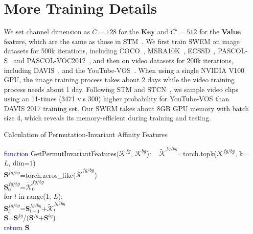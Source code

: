 \section{More Training Details}
\label{sec:TraingDetails}
We set channel dimension as $C=128$ for the \textbf{Key}  and $C'=512$ for the \textbf{Value} feature, which are the same as those in STM~\cite{Oh_2019_ICCV}. 
We first train SWEM on image datasets for 500k iterations, including COCO~\cite{cocolin2014microsoft}, MSRA10K~\cite{msra10kChengPAMI}, ECSSD~\cite{ecssdshi2015hierarchical}, PASCOL-S~\cite{pascalsli2014secrets} and PASCOL-VOC2012~\cite{pascolvoceveringham2010pascal}, and then on video datasets for 200k iterations, including DAVIS~\cite{pont20172017}, and the YouTube-VOS~\cite{xu2018youtube}. When using a single NVIDIA V100 GPU, the image training process takes about 2 days while the video training process needs about 1 day.
Following STM and STCN~\cite{cheng2021stcn}, 
we sample video clips using an 11-times (3471 v.s 300) higher probability for YouTube-VOS than DAVIS 2017 training set. Our SWEM takes about 8GB GPU memory with batch size 4, which reveals its memory-efficient during training and testing.

\begin{algorithm}
\caption{Calculation of Permutation-Invariant Affinity Features}\label{alg:S}
\LinesNumbered
{}

\textcolor{blue}{function} GetPermutInvariantFeatures($\mathcal{K}^{fg}$, $\mathcal{K}^{bg}$): \
\quad \textcolor{cyan}{}
\quad $\tilde{\mathcal{K}}^{fg/bg}$=torch.topk($\mathcal{K}^{fg/bg}$, k=$L$, dim=$1$) \\
\quad \textcolor{cyan}{ }
\quad $\mathbf{S}^{fg/bg}$=torch.zeros\_like($\tilde{\mathcal{K}}^{fg/bg}$) \\
\quad $\mathbf{S}^{fg/bg}_{0}$=$\tilde{\mathcal{K}}^{fg/bg}_{0}$ \\
\quad for $l$ in range($1$, $L$): \\
\quad \quad $\mathbf{S}^{fg/bg}_l$=$\mathbf{S}^{fg/bg}_{l-1}$+$\tilde{\mathcal{K}}^{fg/bg}_{l}$ \\
\quad $\mathbf{S}$=$\mathbf{S}^{fg}$/($\mathbf{S}^{fg}$+$\mathbf{S}^{bg}$) \\
\textcolor{blue}{return} $\mathbf{S}$ 
\end{algorithm}

